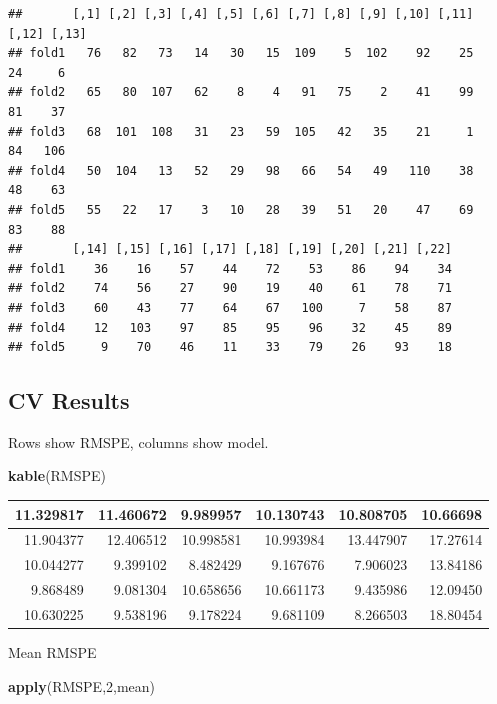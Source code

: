 \documentclass[]{book}
\newenvironment{Shaded}{\begin{snugshade}}{\end{snugshade}}
\newcommand{\KeywordTok}[1]{\textcolor[rgb]{0.13,0.29,0.53}{\textbf{#1}}}
\newcommand{\DecValTok}[1]{\textcolor[rgb]{0.00,0.00,0.81}{#1}}
\newcommand{\NormalTok}[1]{#1}
\begin{document}
\begin{verbatim}
##       [,1] [,2] [,3] [,4] [,5] [,6] [,7] [,8] [,9] [,10] [,11] [,12] [,13]
## fold1   76   82   73   14   30   15  109    5  102    92    25    24     6
## fold2   65   80  107   62    8    4   91   75    2    41    99    81    37
## fold3   68  101  108   31   23   59  105   42   35    21     1    84   106
## fold4   50  104   13   52   29   98   66   54   49   110    38    48    63
## fold5   55   22   17    3   10   28   39   51   20    47    69    83    88
##       [,14] [,15] [,16] [,17] [,18] [,19] [,20] [,21] [,22]
## fold1    36    16    57    44    72    53    86    94    34
## fold2    74    56    27    90    19    40    61    78    71
## fold3    60    43    77    64    67   100     7    58    87
## fold4    12   103    97    85    95    96    32    45    89
## fold5     9    70    46    11    33    79    26    93    18
\end{verbatim}

\subsection{CV Results}\label{cv-results}

Rows show RMSPE, columns show model.

\begin{Shaded}
\begin{Highlighting}[]
\KeywordTok{kable}\NormalTok{(RMSPE)}
\end{Highlighting}
\end{Shaded}

\begin{tabular}{r|r|r|r|r|r}
\hline
11.329817 & 11.460672 & 9.989957 & 10.130743 & 10.808705 & 10.66698\\
\hline
11.904377 & 12.406512 & 10.998581 & 10.993984 & 13.447907 & 17.27614\\
\hline
10.044277 & 9.399102 & 8.482429 & 9.167676 & 7.906023 & 13.84186\\
\hline
9.868489 & 9.081304 & 10.658656 & 10.661173 & 9.435986 & 12.09450\\
\hline
10.630225 & 9.538196 & 9.178224 & 9.681109 & 8.266503 & 18.80454\\
\hline
\end{tabular}

Mean RMSPE

\begin{Shaded}
\begin{Highlighting}[]
\KeywordTok{apply}\NormalTok{(RMSPE,}\DecValTok{2}\NormalTok{,mean)}
\end{Highlighting}
\end{Shaded}
\end{document}
